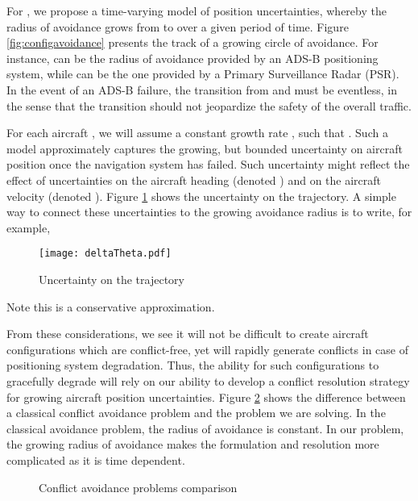 \documentclass[a4paper, 10pt]{IEEEtran}
\begin{document}
For , we propose a time-varying model of position uncertainties, whereby the radius of avoidance grows from  to  over a given period of time.  Figure \ref{fig:configavoidance} presents the track of a growing circle of avoidance. For instance,  can be the radius of avoidance provided by an ADS-B positioning system, while  can be the one provided by a Primary Surveillance Radar (PSR). In the event of an ADS-B failure, the transition from  and  must be eventless, in the sense that the transition should not jeopardize the safety of the overall traffic.

 For each aircraft , we will assume a constant growth rate , such that .  Such a model approximately captures the growing, but bounded uncertainty on aircraft position once the navigation system has failed. Such uncertainty might reflect the effect of uncertainties on the aircraft heading (denoted ) and on the aircraft velocity (denoted ). Figure \ref{fig:deltaTheta} shows the uncertainty on the trajectory. A simple way to connect these uncertainties to the growing avoidance radius is to write, for example,


\begin{figure}[ht]
\centering
    \texttt{[image: deltaTheta.pdf]}
    \caption{Uncertainty on the trajectory}
\label{fig:deltaTheta}
\end{figure}

Note this is a conservative approximation.




From these considerations, we see it will not be difficult to create aircraft configurations which are conflict-free, yet will rapidly generate conflicts in case of positioning system degradation. Thus, the ability for such configurations to gracefully degrade will rely on our ability to develop a conflict resolution strategy for growing aircraft position uncertainties.  Figure \ref{fig:conflictComparison} shows the difference between a classical conflict avoidance problem and the problem we are solving. In the classical avoidance problem, the radius of avoidance is constant. In our problem, the growing radius of avoidance makes the formulation and resolution more complicated as it is time dependent.

 \begin{figure}[ht]
\begin{center}
\caption{Conflict avoidance problems comparison}\label{fig:conflictComparison}
\end{center}
\end{figure}
\end{document}
